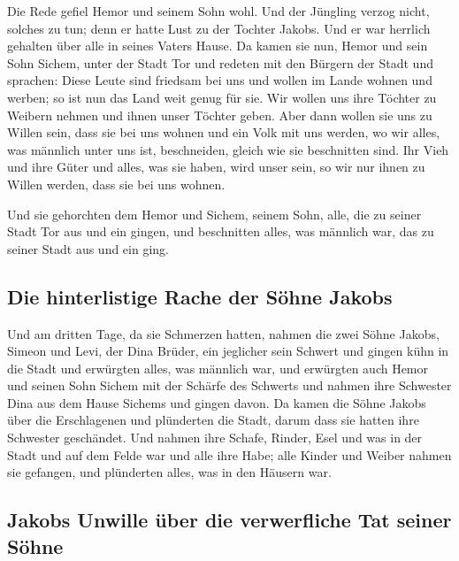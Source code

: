  Die Rede gefiel Hemor und seinem Sohn wohl.
 Und der Jüngling verzog nicht, solches zu tun; denn er
hatte Lust zu der Tochter Jakobs. Und er war herrlich gehalten über alle
in seines Vaters Hause.  Da kamen sie nun, Hemor und sein
Sohn Sichem, unter der Stadt Tor und redeten mit den Bürgern der Stadt
und sprachen:  Diese Leute sind friedsam bei uns und
wollen im Lande wohnen und werben; so ist nun das Land weit genug für
sie. Wir wollen uns ihre Töchter zu Weibern nehmen und ihnen unser
Töchter geben.  Aber dann wollen sie uns zu Willen sein,
dass sie bei uns wohnen und ein Volk mit uns werden, wo wir alles, was
männlich unter uns ist, beschneiden, gleich wie sie beschnitten sind.
 Ihr Vieh und ihre Güter und alles, was sie haben, wird
unser sein, so wir nur ihnen zu Willen werden, dass sie bei uns wohnen.

 Und sie gehorchten dem Hemor und Sichem, seinem Sohn,
alle, die zu seiner Stadt Tor aus und ein gingen, und beschnitten alles,
was männlich war, das zu seiner Stadt aus und ein ging.

\hypertarget{die-hinterlistige-rache-der-suxf6hne-jakobs}{%
\subsection{Die hinterlistige Rache der Söhne
Jakobs}\label{die-hinterlistige-rache-der-suxf6hne-jakobs}}

 Und am dritten Tage, da sie Schmerzen hatten, nahmen die
zwei Söhne Jakobs, Simeon und Levi, der Dina Brüder, ein jeglicher sein
Schwert und gingen kühn in die Stadt und erwürgten alles, was männlich
war,  und erwürgten auch Hemor und seinen Sohn Sichem mit
der Schärfe des Schwerts und nahmen ihre Schwester Dina aus dem Hause
Sichems und gingen davon.  Da kamen die Söhne Jakobs über
die Erschlagenen und plünderten die Stadt, darum dass sie hatten ihre
Schwester geschändet.  Und nahmen ihre Schafe, Rinder,
Esel und was in der Stadt und auf dem Felde war  und alle
ihre Habe; alle Kinder und Weiber nahmen sie gefangen, und plünderten
alles, was in den Häusern war.

\hypertarget{jakobs-unwille-uxfcber-die-verwerfliche-tat-seiner-suxf6hne}{%
\subsection{Jakobs Unwille über die verwerfliche Tat seiner
Söhne}\label{jakobs-unwille-uxfcber-die-verwerfliche-tat-seiner-suxf6hne}}

